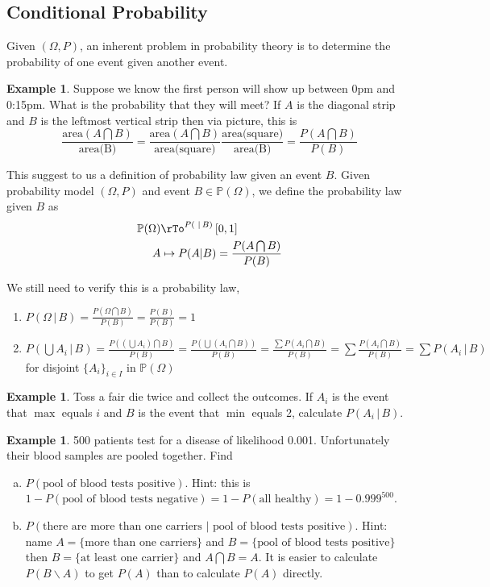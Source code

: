 \documentclass[12pt]{amsart}
\theoremstyle{definition}
\newtheorem{example}[theorem]{Example}
\begin{document}
\subsection{Conditional Probability} \label{conditional_probability} Given $(\Omega, P)$, an inherent problem in probability theory is to determine the probability of one event given another event.
\begin{example} Suppose we know the first person will show up between 0pm and 0:15pm. What is the probability that they will meet? If $A$ is the diagonal strip and $B$ is the leftmost vertical strip then via picture, this is
$$\frac{\text{area}(A \bigcap B)}{\text{area(B)}} = \frac{\text{area}(A \bigcap B)}{\text{area(square)}} \frac{\text{area(square)}}{\text{area(B)}} = \frac{P(A \bigcap B)}{P(B)}$$
\end{example}

This suggest to us a definition of probability law given an event $B$.
\dfn\label{conditional_probabilitylaw} Given probability model $(\Omega, P)$ and event $B \in \mathbb{P}(\Omega)$, we define the probability law given $B$ as
\begin{align*}
\mathbb{P}(\Omega) & \rTo^{P( \,\,|\, B)} \, [0,1] \\
A & \mapsto P(A|B) = \frac{P(A \bigcap B)}{P(B)}
\end{align*}

We still need to verify this is a probability law,
\begin{enumerate}[1.]
\item $P(\Omega \,|\, B) = \frac{P(\Omega \bigcap B)}{P(B)} = \frac{P(B)}{P(B)} = 1$
\item $ P( \bigcup A_i \,|\, B) = \frac{P( (\bigcup A_i) \bigcap B)}{P(B)} = \frac{P(\bigcup (A_i \bigcap B))}{P(B)} = \frac{\sum P(A_i \bigcap B)}{P(B)} = \sum \frac{P(A_i \bigcap B)}{P(B)} = \sum P(A_i \,|\, B)$ for disjoint $\{A_i\}_{i \in I}$ in $\mathbb{P}(\Omega)$
\end{enumerate}

\begin{example}Toss a fair die twice and collect the outcomes. If $A_i$ is the event that $\max$ equals $i$ and $B$ is the event that $\min$ equals 2, calculate $P(A_i \,|\, B)$.
\end{example}

\begin{example} \label{diseasetest} 500 patients test for a disease of likelihood 0.001. Unfortunately their blood samples are pooled together. Find
\begin{enumerate}[a.]
\item $P(\text{pool of blood tests positive})$. Hint: this is $1 - P(\text{pool of blood tests negative}) = 1 - P(\text{all healthy}) = 1 - 0.999^{500}$.
\item $P(\text{there are more than one carriers } | \text{ pool of blood tests positive})$. Hint: name $A = \{\text{more than one carriers}\}$ and $B = \{\text{pool of blood tests positive}\}$ then $B = \{\text{at least one carrier}\}$ and $A \bigcap B = A$. It is easier to calculate $P(B\backslash A)$ to get $P(A)$ than to calculate $P(A)$ directly.
\end{enumerate}
\end{example}
\end{document}
